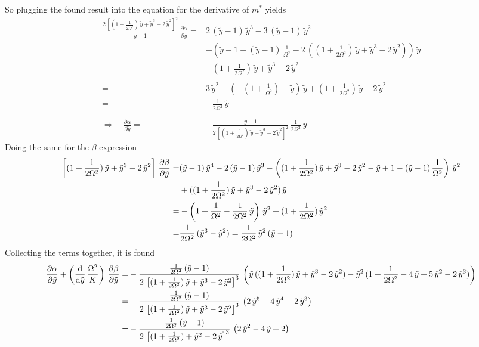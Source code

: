 \documentclass{article}
\begin{document}
So plugging the found result into the equation for the derivative of $m^*$ yields
\begin{align*}
    \frac{2\,\left[(1+\frac{1}{2\Omega^2})\,\tilde{y}+\tilde{y}^3-2\,\tilde{y}^2\right]^2}{\tilde{y}-1}\,\frac{\partial \alpha}{\partial\tilde{y}}=&2\,(\tilde{y}-1)\,\tilde{y}^3-3\,(\tilde{y}-1)\,\tilde{y}^2\\
    &+\left( \tilde{y}-1+(\tilde{y}-1)\,\frac{1}{\Omega^2}-2\,\left((1+\frac{1}{2\Omega^2})\,\tilde{y}+\tilde{y}^3-2\,\tilde{y}^2\right) \right)\,\tilde{y}\\
    &+(1+\frac{1}{2\Omega^2})\,\tilde{y}+\tilde{y}^3-2\,\tilde{y}^2 \\\\
    =&3\,\tilde{y}^2+\left( -(1+\frac{1}{\Omega^2})-\tilde{y}\right)\,\tilde{y}+(1+\frac{1}{2\Omega^2})\,\tilde{y}-2\,\tilde{y}^2\\
    =&-\frac{1}{2\Omega^2}\,\tilde{y}\\\\
    \Rightarrow\quad\frac{\partial \alpha}{\partial\tilde{y}}=&-\frac{\tilde{y}-1}{2\,\left[(1+\frac{1}{2\Omega^2})\,\tilde{y}+\tilde{y}^3-2\,\tilde{y}^2\right]^2}\,\frac{1}{2\Omega^2}\,\tilde{y}
\end{align*}
Doing the same for the $\beta$-expression
\begin{align*}
    \left[(1+\frac{1}{2\Omega^2})\,\tilde{y}+\tilde{y}^3-2\,\tilde{y}^2\right]\,\frac{\partial \beta}{\partial\tilde{y}}=&(\tilde{y}-1)\,\tilde{y}^4-2\,(\tilde{y}-1)\,\tilde{y}^3-\left( (1+\frac{1}{2\Omega^2})\,\tilde{y}+\tilde{y}^3-2\,\tilde{y}^2-\tilde{y}+1-(\tilde{y}-1)\,\frac{1}{\Omega^2} \right)\,\tilde{y}^2\\
    &+((1+\frac{1}{2\Omega^2})\,\tilde{y}+\tilde{y}^3-2\,\tilde{y}^2)\,\tilde{y}\\
    =&-\left( 1+\frac{1}{\Omega^2}-\frac{1}{2\Omega^2}\,\tilde{y}  \right)\,\tilde{y}^2+(1+\frac{1}{2\Omega^2})\,\tilde{y}^2\\
    =&\frac{1}{2\Omega^2}\,(\tilde{y}^3-\tilde{y}^2)=\frac{1}{2\Omega^2}\,\tilde{y}^2\,(\tilde{y}-1)
\end{align*}
Collecting the terms together, it is found
\begin{align*}
    \frac{\partial \alpha}{\partial\tilde{y}}+\left(\frac{\text{d}}{\text{d}\tilde{y}}\,\frac{\Omega^2}{K}\right)\,\frac{\partial \beta}{\partial\tilde{y}}=&-\frac{\frac{1}{2\Omega^2}\,(\tilde{y}-1)}{2\,\left[(1+\frac{1}{2\Omega^2})\,\tilde{y}+\tilde{y}^3-2\,\tilde{y}^2\right]^3}\,\left( \tilde{y}\,((1+\frac{1}{2\Omega^2})\,\tilde{y}+\tilde{y}^3-2\,\tilde{y}^2) -\tilde{y}^2\,(1+\frac{1}{2\Omega^2}-4\,\tilde{y}+5\,\tilde{y}^2-2\,\tilde{y}^3)\right)\\
    =&-\frac{\frac{1}{2\Omega^2}\,(\tilde{y}-1)}{2\,\left[(1+\frac{1}{2\Omega^2})\,\tilde{y}+\tilde{y}^3-2\,\tilde{y}^2\right]^3}\,\left( 2\,\tilde{y}^5-4\,\tilde{y}^4+2\,\tilde{y}^3 \right)\\
    =&-\frac{\frac{1}{2\Omega^2}\,(\tilde{y}-1)}{2\,\left[(1+\frac{1}{2\Omega^2})+\tilde{y}^2-2\,\tilde{y}\right]^3}\,\left( 2\,\tilde{y}^2-4\,\tilde{y}+2 \right)
\end{align*}
\end{document}

